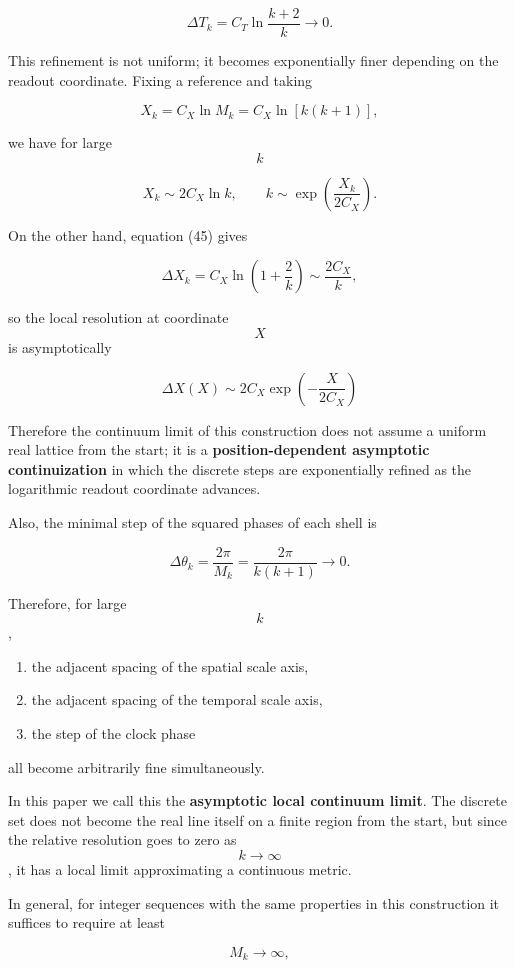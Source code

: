 \documentclass[
  a4paper,
]{article}
\providecommand{\tightlist}{%
  \setlength{\itemsep}{0pt}\setlength{\parskip}{0pt}}
\begin{document}
\[
\Delta T_k
=
C_T\ln\frac{k+2}{k}
\longrightarrow0.
\tag{46}
\]

This refinement is not uniform; it becomes exponentially finer depending
on the readout coordinate. Fixing a reference and taking

\[
X_k=C_X\ln M_k
=C_X\ln[k(k+1)],
\]

we have for large \[k\]

\[
X_k\sim2C_X\ln k,
\qquad
k\sim\exp\left(\frac{X_k}{2C_X}\right).
\]

On the other hand, equation (45) gives

\[
\Delta X_k
=C_X\ln\left(1+\frac{2}{k}\right)
\sim\frac{2C_X}{k},
\]

so the local resolution at coordinate \[X\] is asymptotically

\[
\boxed{
\Delta X(X)
\sim
2C_X
\exp\left(-\frac{X}{2C_X}\right)
}
\tag{46a}
\]

Therefore the continuum limit of this construction does not assume a
uniform real lattice from the start; it is a \textbf{position-dependent
asymptotic continuization} in which the discrete steps are exponentially
refined as the logarithmic readout coordinate advances.

Also, the minimal step of the squared phases of each shell is

\[
\Delta\theta_k
=
\frac{2\pi}{M_k}
=
\frac{2\pi}{k(k+1)}
\longrightarrow0.
\tag{47}
\]

Therefore, for large \[k\],

\begin{enumerate}
\def\labelenumi{\arabic{enumi}.}
\tightlist
\item
  the adjacent spacing of the spatial scale axis,
\item
  the adjacent spacing of the temporal scale axis,
\item
  the step of the clock phase
\end{enumerate}

all become arbitrarily fine simultaneously.

In this paper we call this the \textbf{asymptotic local continuum
limit}. The discrete set does not become the real line itself on a
finite region from the start, but since the relative resolution goes to
zero as \[k\to\infty\], it has a local limit approximating a continuous
metric.

In general, for integer sequences with the same properties in this
construction it suffices to require at least

\[
M_k\to\infty,
\]
\end{document}
